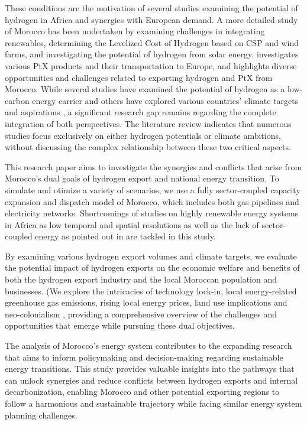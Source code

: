 These conditions are the motivation of several studies \cite{Wijk2021, AbouSeada2022, Zwaan2021, Schellekens2010, Cavana2021, Touili2022, Timmerberg2019, Sens2022} examining the potential of hydrogen in Africa and synergies with European demand. A more detailed study of Morocco has been undertaken by \cite{Boulakhbar2020} examining challenges in integrating renewables, \cite{Khouya2020} determining the Levelized Cost of Hydrogen based on CSP and wind farms, and \cite{Touili2018} investigating the potential of hydrogen from solar energy. \cite{Hampp2021} investigates various PtX products and their transportation to Europe, and \cite{Eichhammer2019} highlights diverse opportunities and challenges related to exporting hydrogen and PtX from Morocco. While several studies have examined the potential of hydrogen as a low-carbon energy carrier \cite{Hampp2021, AbouSeada2022, Wijk2021} and others have explored various countries' climate targets and aspirations \cite{Boulakhbar2020}, a significant research gap remains regarding the complete integration of both perspectives. The literature review indicates that numerous studies focus exclusively on either hydrogen potentials or climate ambitions, without discussing the complex relationship between these two critical aspects.

This research paper aims to investigate the synergies and conflicts that arise from Morocco's dual goals of hydrogen export and national energy transition. To simulate and otimize a variety of scenarios, we use a fully sector-coupled capacity expansion and dispatch model of Morocco, which includes both gas pipelines and electricity networks.
Shortcomings of studies on highly renewable energy systems in Africa as low temporal and spatial resolutions as well as the lack of sector-coupled energy as pointed out in \cite{Oyewo2023} are tackled in this study.

By examining various hydrogen export volumes and climate targets, we evaluate the potential impact of hydrogen exports on the economic welfare and benefits of both the hydrogen export industry and the local Moroccan population and businesses. (We explore the intricacies of technology lock-in, local energy-related greenhouse gas emissions, rising local energy prices, land use implications and neo-colonialism \cite{HabeckEnergieimperialismus, TerraponPfaff2019, Hanger2016}, providing a comprehensive overview of the challenges and opportunities that emerge while pursuing these dual objectives.

The analysis of Morocco's energy system contributes to the expanding research that aims to inform policymaking and decision-making regarding sustainable energy transitions. This study provides valuable insights into the pathways that can unlock synergies and reduce conflicts between hydrogen exports and internal decarbonization, enabling Morocco and other potential exporting regions to follow a harmonious and sustainable trajectory while facing similar energy system planning challenges.



